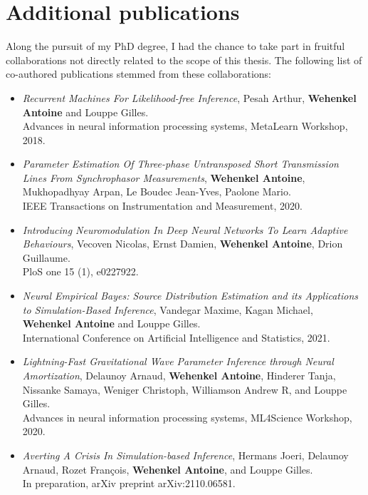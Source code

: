 \section{Additional publications}

Along the pursuit of my PhD degree, I had the chance to take part in fruitful collaborations not directly related to the scope of this thesis.
The following list of co-authored publications stemmed from these collaborations:
\begin{itemize}
\item[] \citep{pesah2018recurrent} \textit{Recurrent Machines For Likelihood-free Inference}, Pesah Arthur, \textbf{Wehenkel Antoine} and Louppe Gilles.\\
Advances in neural information processing systems, MetaLearn Workshop, 2018.

\item[] \citep{wehenkel2020parameter} \textit{Parameter Estimation Of Three-phase Untransposed Short Transmission Lines From Synchrophasor Measurements},
\textbf{Wehenkel Antoine}, Mukhopadhyay Arpan, Le Boudec Jean-Yves, Paolone Mario.\\
IEEE Transactions on Instrumentation and Measurement, 2020.

\item[] \citep{vecoven2020introducing} \textit{Introducing Neuromodulation In Deep Neural Networks To Learn Adaptive Behaviours},
Vecoven Nicolas, Ernst Damien, \textbf{Wehenkel Antoine}, Drion Guillaume.\\
PloS one 15 (1), e0227922.

\item[] \citep{vandegar2021neural} \textit{Neural Empirical Bayes: Source Distribution Estimation and its Applications to Simulation-Based Inference},
Vandegar Maxime, Kagan Michael, \textbf{Wehenkel Antoine} and Louppe Gilles.\\
International Conference on Artificial Intelligence and Statistics, 2021.

\item[] \citep{delaunoy2020lightning} \textit{Lightning-Fast Gravitational Wave Parameter Inference through Neural Amortization},
Delaunoy Arnaud, \textbf{Wehenkel Antoine}, Hinderer Tanja, Nissanke Samaya, Weniger Christoph, Williamson Andrew R, and Louppe Gilles.\\
Advances in neural information processing systems, ML4Science Workshop, 2020.

\item[] \citep{hermans2021averting} \textit{Averting A Crisis In Simulation-based Inference},
Hermans Joeri, Delaunoy Arnaud, Rozet Fran{\c{c}}ois, \textbf{Wehenkel Antoine}, and Louppe Gilles.\\
In preparation, arXiv preprint arXiv:2110.06581.


\end{itemize}
